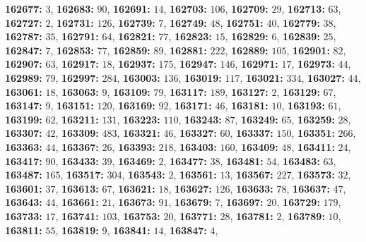 \textsf{\bfseries 162677:} $3$, \textsf{\bfseries 162683:} $90$, \textsf{\bfseries 162691:} $14$, \textsf{\bfseries 162703:} $106$, \textsf{\bfseries 162709:} $29$, \textsf{\bfseries 162713:} $63$, \textsf{\bfseries 162727:} $2$, \textsf{\bfseries 162731:} $126$, \textsf{\bfseries 162739:} $7$, \textsf{\bfseries 162749:} $48$, \textsf{\bfseries 162751:} $40$, \textsf{\bfseries 162779:} $38$, \textsf{\bfseries 162787:} $35$, \textsf{\bfseries 162791:} $64$, \textsf{\bfseries 162821:} $77$, \textsf{\bfseries 162823:} $15$, \textsf{\bfseries 162829:} $6$, \textsf{\bfseries 162839:} $25$, \textsf{\bfseries 162847:} $7$, \textsf{\bfseries 162853:} $77$, \textsf{\bfseries 162859:} $89$, \textsf{\bfseries 162881:} $222$, \textsf{\bfseries 162889:} $105$, \textsf{\bfseries 162901:} $82$, \textsf{\bfseries 162907:} $63$, \textsf{\bfseries 162917:} $18$, \textsf{\bfseries 162937:} $175$, \textsf{\bfseries 162947:} $146$, \textsf{\bfseries 162971:} $17$, \textsf{\bfseries 162973:} $44$, \textsf{\bfseries 162989:} $79$, \textsf{\bfseries 162997:} $284$, \textsf{\bfseries 163003:} $136$, \textsf{\bfseries 163019:} $117$, \textsf{\bfseries 163021:} $334$, \textsf{\bfseries 163027:} $44$, \textsf{\bfseries 163061:} $18$, \textsf{\bfseries 163063:} $9$, \textsf{\bfseries 163109:} $79$, \textsf{\bfseries 163117:} $189$, \textsf{\bfseries 163127:} $2$, \textsf{\bfseries 163129:} $67$, \textsf{\bfseries 163147:} $9$, \textsf{\bfseries 163151:} $120$, \textsf{\bfseries 163169:} $92$, \textsf{\bfseries 163171:} $46$, \textsf{\bfseries 163181:} $10$, \textsf{\bfseries 163193:} $61$, \textsf{\bfseries 163199:} $62$, \textsf{\bfseries 163211:} $131$, \textsf{\bfseries 163223:} $110$, \textsf{\bfseries 163243:} $87$, \textsf{\bfseries 163249:} $65$, \textsf{\bfseries 163259:} $28$, \textsf{\bfseries 163307:} $42$, \textsf{\bfseries 163309:} $483$, \textsf{\bfseries 163321:} $46$, \textsf{\bfseries 163327:} $60$, \textsf{\bfseries 163337:} $150$, \textsf{\bfseries 163351:} $266$, \textsf{\bfseries 163363:} $44$, \textsf{\bfseries 163367:} $26$, \textsf{\bfseries 163393:} $218$, \textsf{\bfseries 163403:} $160$, \textsf{\bfseries 163409:} $48$, \textsf{\bfseries 163411:} $24$, \textsf{\bfseries 163417:} $90$, \textsf{\bfseries 163433:} $39$, \textsf{\bfseries 163469:} $2$, \textsf{\bfseries 163477:} $38$, \textsf{\bfseries 163481:} $54$, \textsf{\bfseries 163483:} $63$, \textsf{\bfseries 163487:} $165$, \textsf{\bfseries 163517:} $304$, \textsf{\bfseries 163543:} $2$, \textsf{\bfseries 163561:} $13$, \textsf{\bfseries 163567:} $227$, \textsf{\bfseries 163573:} $32$, \textsf{\bfseries 163601:} $37$, \textsf{\bfseries 163613:} $67$, \textsf{\bfseries 163621:} $18$, \textsf{\bfseries 163627:} $126$, \textsf{\bfseries 163633:} $78$, \textsf{\bfseries 163637:} $47$, \textsf{\bfseries 163643:} $44$, \textsf{\bfseries 163661:} $21$, \textsf{\bfseries 163673:} $91$, \textsf{\bfseries 163679:} $7$, \textsf{\bfseries 163697:} $20$, \textsf{\bfseries 163729:} $179$, \textsf{\bfseries 163733:} $17$, \textsf{\bfseries 163741:} $103$, \textsf{\bfseries 163753:} $20$, \textsf{\bfseries 163771:} $28$, \textsf{\bfseries 163781:} $2$, \textsf{\bfseries 163789:} $10$, \textsf{\bfseries 163811:} $55$, \textsf{\bfseries 163819:} $9$, \textsf{\bfseries 163841:} $14$, \textsf{\bfseries 163847:} $4$, 
